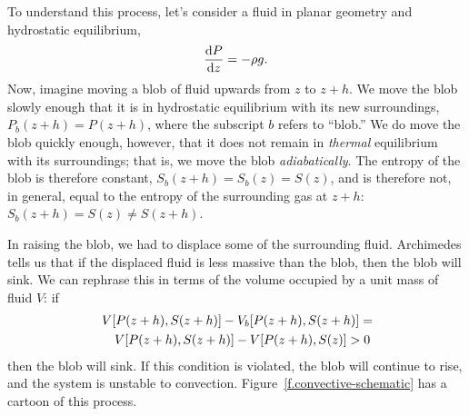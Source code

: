 To understand this process, let's consider a fluid in planar geometry and hydrostatic equilibrium,
\begin{equation}
\frac{\mathrm{d} P}{\mathrm{d} z} = -\rho g.
\end{equation}
Now, imagine moving a blob of fluid upwards from $z$ to $z+h$.  We move the blob slowly enough that it is in hydrostatic equilibrium with its new surroundings, $P_{b}(z+h) = P(z+h)$, where the subscript $b$ refers to ``blob.'' We do move the blob quickly enough, however,  that it does not remain in \emph{thermal} equilibrium with its surroundings; that is, we move the blob \emph{adiabatically}.  The entropy of the blob is therefore constant, 
$S_{b}(z+h) = S_{b}(z) = S(z)$, and is therefore not, in general, equal to the entropy of the surrounding gas at $z+h$: $S_{b}(z+h) = S(z) \neq S(z+h)$.  

In raising the blob, we had to displace some of the surrounding fluid. Archimedes tells us that if the displaced fluid is less massive than the blob, then the blob will sink.  We can rephrase this in terms of the volume occupied by a unit mass of fluid $V$: if
\begin{eqnarray}
\lefteqn{V[P(z+h),S(z+h)] - V_{b}[P(z+h),S(z+h)] =}\nonumber\\
&&  V[P(z+h),S(z+h)] - V[P(z+h),S(z)] > 0
\label{e.archimedes}
\end{eqnarray}
then the blob will sink. If this condition is violated, the blob will continue to rise, and the system is unstable to convection.  
Figure~\ref{f.convective-schematic} has a cartoon of this process.


